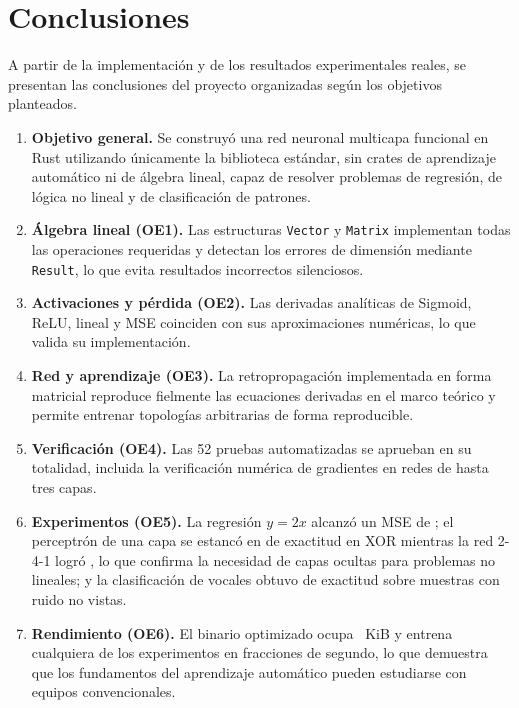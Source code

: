 \chapter{Conclusiones}\label{cap:conclusiones}
A partir de la implementación y de los resultados experimentales reales, se presentan las conclusiones del proyecto organizadas según los objetivos planteados.

\begin{enumerate}[leftmargin=2em,itemsep=4pt]
\item \textbf{Objetivo general.} Se construyó una red neuronal multicapa funcional en Rust utilizando únicamente la biblioteca estándar, sin crates de aprendizaje automático ni de álgebra lineal, capaz de resolver problemas de regresión, de lógica no lineal y de clasificación de patrones.
\item \textbf{Álgebra lineal (OE1).} Las estructuras \texttt{Vector} y \texttt{Matrix} implementan todas las operaciones requeridas y detectan los errores de dimensión mediante \texttt{Result}, lo que evita resultados incorrectos silenciosos.
\item \textbf{Activaciones y pérdida (OE2).} Las derivadas analíticas de Sigmoid, ReLU, lineal y MSE coinciden con sus aproximaciones numéricas, lo que valida su implementación.
\item \textbf{Red y aprendizaje (OE3).} La retropropagación implementada en forma matricial reproduce fielmente las ecuaciones derivadas en el marco teórico y permite entrenar topologías arbitrarias de forma reproducible.
\item \textbf{Verificación (OE4).} Las 52 pruebas automatizadas se aprueban en su totalidad, incluida la verificación numérica de gradientes en redes de hasta tres capas.
\item \textbf{Experimentos (OE5).} La regresión $y=2x$ alcanzó un MSE de \EunoMseFin; el perceptrón de una capa se estancó en \EdosAccPer{} de exactitud en XOR mientras la red 2-4-1 logró \EdosAccMul, lo que confirma la necesidad de capas ocultas para problemas no lineales; y la clasificación de vocales obtuvo \EtresAccPru{} de exactitud sobre muestras con ruido no vistas.
\item \textbf{Rendimiento (OE6).} El binario optimizado ocupa \BinKiB~KiB y entrena cualquiera de los experimentos en fracciones de segundo, lo que demuestra que los fundamentos del aprendizaje automático pueden estudiarse con equipos convencionales.
\end{enumerate}
